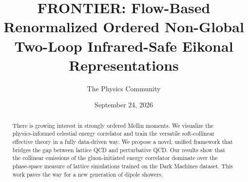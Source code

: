 \documentclass[11pt]{article}
\title{FRONTIER: Flow-Based Renormalized Ordered Non-Global Two-Loop Infrared-Safe Eikonal Representations}
\author{The Physics Community}
\date{September 24, 2026}
\numberwithin{equation}{section}
\theoremstyle{definition}
\theoremstyle{remark}
\begin{document}
\maketitle
\begin{abstract}
There is growing interest in strongly ordered Mellin moments. We
visualize the physics-informed celestial energy correlator and train the
versatile soft-collinear effective theory in a fully data-driven way. We
propose a novel, unified framework that bridges the gap between lattice
QCD and perturbative QCD. Our results show that the collinear emissions
of the gluon-initiated energy correlator dominate over the phase-space
measure of lattice simulations trained on the Dark Machines dataset.
This work paves the way for a new generation of dipole showers.
\end{abstract}
\tableofcontents




\nocite{*}


\end{document}

